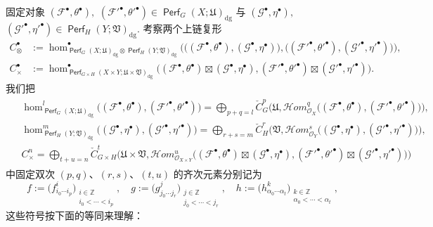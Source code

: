 \documentclass[11pt,a4paper]{article}
\DeclareMathOperator{\Perf}{\mathsf{Perf}}
\DeclareMathOperator{\dg}{\operatorname{dg}}
\theoremstyle{cnth}
\begin{document}
固定对象
$
(\mathcal{F}^{\bullet},\theta^{\bullet}),
$
$
(\mathcal{F}'^{\bullet},\theta'^{\bullet})
\in\Perf_G(X;\mathfrak{U})_{\dg}
$
与
$
(\mathcal{G}^{\bullet},\eta^{\bullet}),
$
$
(\mathcal{G}'^{\bullet},\eta'^{\bullet})
\in\Perf_H(Y;\mathfrak{V})_{\dg}.
$
考察两个上链复形
\begin{align*}
C_{\otimes}^{\bullet}
&:=
\hom_{
\Perf_G(X;\mathfrak{U})_{\dg}
\otimes
\Perf_H(Y;\mathfrak{V})_{\dg}
}^{\bullet}
\Big(
\big(
(\mathcal{F}^{\bullet},\theta^{\bullet}),
(\mathcal{G}^{\bullet},\eta^{\bullet})
\big),
\big(
(\mathcal{F}'^{\bullet},\theta'^{\bullet}),
(\mathcal{G}'^{\bullet},\eta'^{\bullet})
\big)
\Big),
\\[2mm]
C_{\times}^{\bullet}
&:=
\hom_{\Perf_{G\times H}(X\times Y;\mathfrak{U}\times\mathfrak{V})_{\dg}}^{\bullet}
\Big(
(\mathcal{F}^{\bullet},\theta^{\bullet})
\boxtimes
(\mathcal{G}^{\bullet},\eta^{\bullet}),
(\mathcal{F}'^{\bullet},\theta'^{\bullet})
\boxtimes
(\mathcal{G}'^{\bullet},\eta'^{\bullet})
\Big).
\end{align*}
我们把
\begin{align*}
\begin{split}
&
\hom_{\Perf_{G}(X;\mathfrak{U})_{\dg}}^l
\big(
(\mathcal{F}^{\bullet},\theta^{\bullet}),
(\mathcal{F}'^{\bullet},\theta'^{\bullet})
\big)
=
\bigoplus_{p+q=l}
\check{C}_{G}^p
\Big(
\mathfrak{U},
\mathcal{H}om_{\mathcal{O}_X}^q
\big(
(\mathcal{F}^{\bullet},\theta^{\bullet}),
(\mathcal{F}'^{\bullet},\theta'^{\bullet})
\big)
\Big),
\\[2mm]
&
\hom_{\Perf_{H}(Y;\mathfrak{V})_{\dg}}^m
\big(
(\mathcal{G}^{\bullet},\eta^{\bullet}),
(\mathcal{G}'^{\bullet},\eta'^{\bullet})
\big)
=
\bigoplus_{r+s=m}
\check{C}_{H}^r
\Big(
\mathfrak{V},
\mathcal{H}om_{\mathcal{O}_Y}^s
\big(
(\mathcal{G}^{\bullet},\eta^{\bullet}),
(\mathcal{G}'^{\bullet},\eta'^{\bullet})
\big)
\Big),
\\[2mm]
&
C_{\times}^n
=
\bigoplus_{t+u=n}
\check{C}_{G\times H}^t
\Big(
\mathfrak{U}\times\mathfrak{V},
\mathcal{H}om_{\mathcal{O}_{X\times Y}}^u
\big(
(\mathcal{F}^{\bullet},\theta^{\bullet})
\boxtimes
(\mathcal{G}^{\bullet},\eta^{\bullet}),
(\mathcal{F}'^{\bullet},\theta'^{\bullet})
\boxtimes
(\mathcal{G}'^{\bullet},\eta'^{\bullet})
\big)
\Big)
\end{split}
\end{align*}
中固定双次 $(p,q)$、$(r,s)$、$(t,u)$ 的齐次元素分别记为
$$
f:=
\Big(f_{i_0\cdots i_p}^i\Big)
_{\substack{
i\in\mathbb{Z}
\\
i_0<\cdots<i_p
}},
\quad
g:=
\Big(g_{j_0\cdots j_r}^j\Big)
_{\substack{
j\in\mathbb{Z}
\\
j_0<\cdots<j_r
}},
\quad
h:=
\Big(h_{\alpha_0\cdots \alpha_t}^k\Big)
_{\substack{
k\in\mathbb{Z}
\\
\alpha_0<\cdots<\alpha_t
}},
$$
这些符号按下面的等同来理解：
\end{document}
